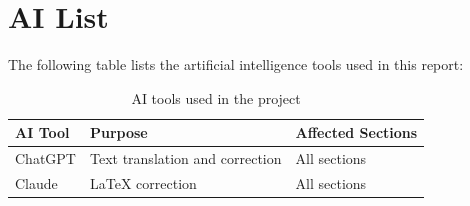 \chapter{AI List}

The following table lists the artificial intelligence tools used in this report:


\begin{table}[h]
\centering
\begin{tabular}{lll}
\toprule
\textbf{AI Tool} & \textbf{Purpose} & \textbf{Affected Sections} \\
\midrule
ChatGPT & Text translation and correction & All sections \\
Claude & LaTeX correction & All sections \\
\bottomrule
\end{tabular}
\caption{AI tools used in the project}
\end{table}